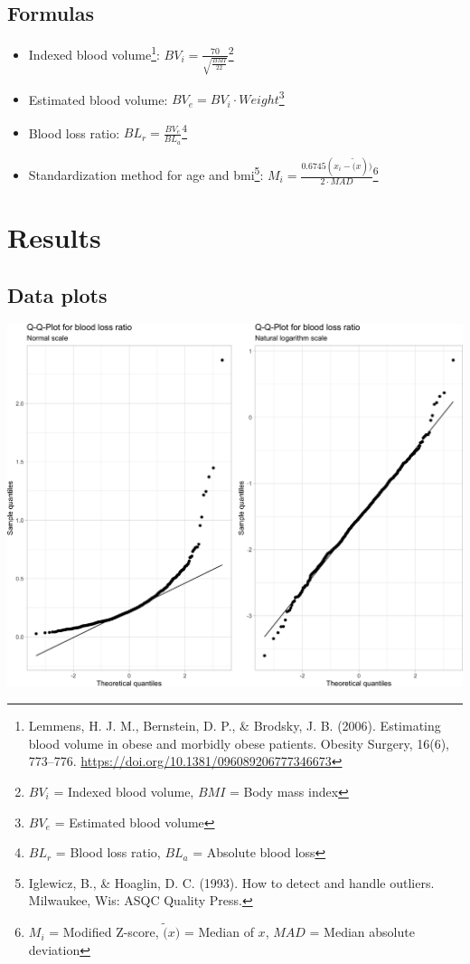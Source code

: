 \documentclass[
]{article}
\providecommand{\tightlist}{%
  \setlength{\itemsep}{0pt}\setlength{\parskip}{0pt}}
\begin{document}
\hypertarget{formulas}{%
\subsection{Formulas}\label{formulas}}

\begin{itemize}
\tightlist
\item
  Indexed blood volume\footnote{Lemmens, H. J. M., Bernstein, D. P., \& Brodsky, J. B. (2006). Estimating blood volume in obese and morbidly obese patients. Obesity Surgery, 16(6), 773--776. \url{https://doi.org/10.1381/096089206777346673}}: \(BV_i = \frac{70}{\sqrt{\frac{BMI}{22}}}\)\footnote{\(BV_i\) = Indexed blood volume, \(BMI\) = Body mass index}
\item
  Estimated blood volume: \(BV_e = BV_i \cdot Weight\)\footnote{\(BV_e\) = Estimated blood volume}
\item
  Blood loss ratio: \(BL_r = \frac{BV_e}{BL_a}\)\footnote{\(BL_r\) = Blood loss ratio, \(BL_a\) = Absolute blood loss}
\item
  Standardization method for age and bmi\footnote{Iglewicz, B., \& Hoaglin, D. C. (1993). How to detect and handle outliers. Milwaukee, Wis: ASQC Quality Press.}: \(M_i = \frac{0.6745(x_i - \tilde(x))}{2 \cdot MAD}\)\footnote{\(M_i\) = Modified Z-score, \(\tilde(x)\) = Median of \(x\), \(MAD\) = Median absolute deviation}
\end{itemize}

\hypertarget{results}{%
\section{Results}\label{results}}

\hypertarget{data-plots}{%
\subsection{Data plots}\label{data-plots}}

\begin{center}\includegraphics[width=1\linewidth]{notebook_files/figure-latex/data_plots-1} \end{center}
\end{document}
